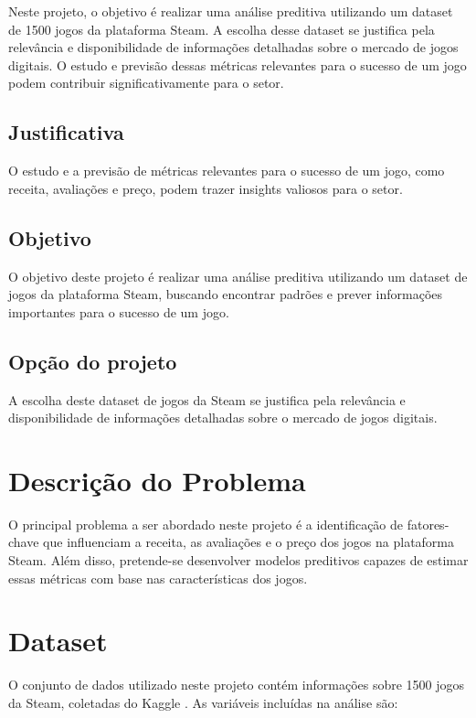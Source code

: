 \documentclass[12pt]{article}
\begin{document}
Neste projeto, o objetivo é realizar uma análise preditiva utilizando um dataset de 1500 jogos da plataforma Steam. A escolha desse dataset se justifica pela relevância e disponibilidade de informações detalhadas sobre o mercado de jogos digitais. O estudo e previsão dessas métricas relevantes para o sucesso de um jogo podem contribuir significativamente para o setor.

\subsection{Justificativa} \label{sec:firstpage}

O estudo e a previsão de métricas relevantes para o sucesso de um jogo, como receita, 
avaliações e preço, podem trazer insights valiosos para o setor.

\subsection{Objetivo}

O objetivo deste projeto é realizar uma análise preditiva utilizando um dataset de 
jogos da plataforma Steam, buscando encontrar padrões e prever informações 
importantes para o sucesso de um jogo.

\subsection{Opção do projeto}

A escolha deste dataset de jogos da Steam se justifica pela relevância e 
disponibilidade de informações detalhadas sobre o mercado de jogos digitais.

\section{Descrição do Problema}

O principal problema a ser abordado neste projeto é a identificação de fatores-chave 
que influenciam a receita, as avaliações e o preço dos jogos na plataforma Steam. 
Além disso, pretende-se desenvolver modelos preditivos capazes de estimar essas 
métricas com base nas características dos jogos.

\section{Dataset}

O conjunto de dados utilizado neste projeto contém informações sobre 1500 jogos da Steam, coletadas do Kaggle \cite{topcu2024top1500}.  As variáveis incluídas na análise são:
\end{document}
